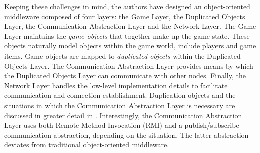 \documentclass{acm_proc_article-sp}
\begin{document}
Keeping these challenges in mind, the authors have designed an object-oriented middleware composed of four layers: the Game Layer, the Duplicated Objects Layer, the Communication Abstraction Layer and the Network Layer.  The Game Layer maintains the \emph{game objects} that together make up the game state.  These objects naturally model objects within the game world, include players and game items.  Game objects are mapped to \emph{duplicated objects} within the Duplicated Objects Layer.  The Communication Abstraction Layer provides means by which the Duplicated Objects Layer can communicate with other nodes.  Finally, the Network Layer handles the low-level implementation details to facilitate communication and connection establishment.  Duplication objects and the situations in which the Communication Abstraction Layer is necessary are discussed in greater detail in \cite{Denault:2008p8364}.  Interestingly, the Communication Abstraction Layer uses both Remote Method Invocation (RMI) and a publish/subscribe communication abstraction, depending on the situation.  The latter abstraction deviates from traditional object-oriented middleware.



\end{document}
